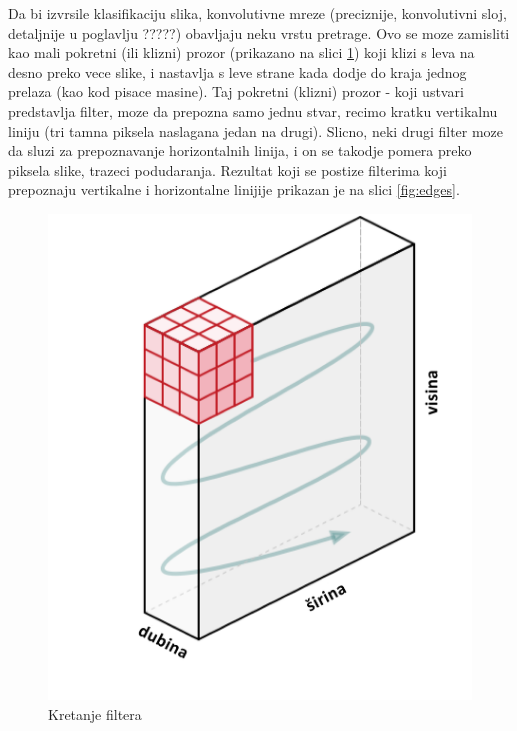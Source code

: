\documentclass[a4paper]{article}
\begin{document}

Da bi izvrsile klasifikaciju slika, konvolutivne mreze (preciznije, konvolutivni sloj, detaljnije u poglavlju ?????) obavljaju neku vrstu pretrage. Ovo se moze zamisliti kao mali pokretni (ili klizni) prozor (prikazano na slici \ref{fig:filter_movement01}) koji klizi s leva na desno preko vece slike, i nastavlja s leve strane kada dodje do kraja jednog prelaza (kao kod pisace masine). Taj pokretni (klizni) prozor - koji ustvari predstavlja filter, moze da prepozna samo jednu stvar, recimo kratku vertikalnu liniju (tri tamna piksela naslagana jedan na drugi). Slicno, neki drugi filter moze da sluzi za prepoznavanje horizontalnih linija, i on se takodje pomera preko piksela slike, trazeci podudaranja. Rezultat koji se postize filterima koji prepoznaju vertikalne i horizontalne linijije prikazan je na slici \ref{fig:edges}.


\begin{figure}[h!]
\begin{center}
\includegraphics[scale=0.4]{filter_movement01.jpg}
\end{center}
\caption{Kretanje filtera}
\label{fig:filter_movement01}
\end{figure}
\end{document}
